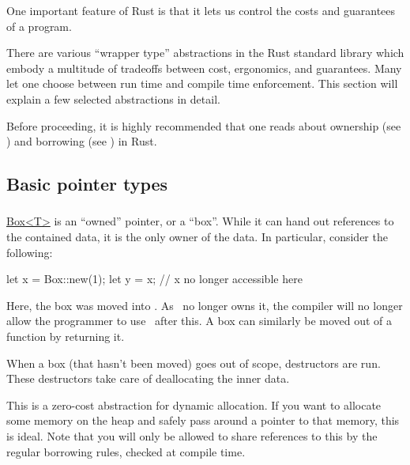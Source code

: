 One important feature of Rust is that it lets us control the costs and guarantees of a program.

\blank

There are various \enquote{wrapper type} abstractions in the Rust standard library which embody a multitude of tradeoffs 
between cost, ergonomics, and guarantees. Many let one choose between run time and compile time enforcement. This section 
will explain a few selected abstractions in detail.

\blank

Before proceeding, it is highly recommended that one reads about ownership (see ) and borrowing 
(see ) in Rust.

\subsection*{Basic pointer types}

\subsubsection*{}

\href{https://doc.rust-lang.org/std/boxed/struct.Box.html}{Box<T>} is an \enquote{owned} pointer, or a \enquote{box}. While 
it can hand out references to the contained data, it is the only owner of the data. In particular, consider the following:

\begin{rustc}
let x = Box::new(1);
let y = x;
// x no longer accessible here
\end{rustc}

Here, the box was moved into \y. As \x\ no longer owns it, the compiler will no longer allow the programmer to use \x\ 
after this. A box can similarly be moved out of a function by returning it.

\blank

When a box (that hasn't been moved) goes out of scope, destructors are run. These destructors take care of deallocating 
the inner data.

\blank

This is a zero-cost abstraction for dynamic allocation. If you want to allocate some memory on the heap and safely pass 
around a pointer to that memory, this is ideal. Note that you will only be allowed to share references to this by the 
regular borrowing rules, checked at compile time.

